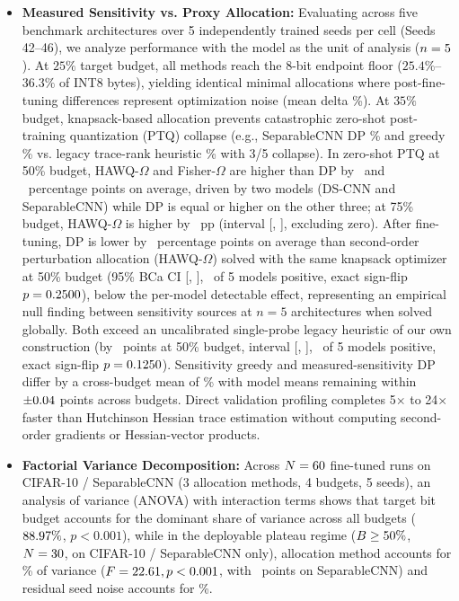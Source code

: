\documentclass{ieeeaccess}
\begin{document}
\begin{itemize}
    \item \textbf{Measured Sensitivity vs. Proxy Allocation:} Evaluating across five benchmark architectures over 5 independently trained seeds per cell (Seeds 42--46), we analyze performance with the model as the unit of analysis ($n = 5$). At $25\%$ target budget, all methods reach the 8-bit endpoint floor ($25.4\%$--$36.3\%$ of INT8 bytes), yielding identical minimal allocations where post-fine-tuning differences represent optimization noise (mean delta \MacroStoryDPHAWQTwentyFive\%). At $35\%$ budget, knapsack-based allocation prevents catastrophic zero-shot post-training quantization (PTQ) collapse (e.g., SeparableCNN DP \MacroSepCNNDPThirtyFivePTQ\% and greedy \MacroSepCNNGreedyThirtyFivePTQ\% vs. legacy trace-rank heuristic \MacroSepCNNHAWQThirtyFivePTQ\% with 3/5 collapse). In zero-shot PTQ at 50\% budget, HAWQ-$\Omega$ and Fisher-$\Omega$ are higher than DP by \MacroPTQDPOmegaAbsMeanFifty\ and \MacroPTQDPFisherAbsMeanFifty\ percentage points on average, driven by two models (DS-CNN and SeparableCNN) while DP is equal or higher on the other three; at 75\% budget, HAWQ-$\Omega$ is higher by \MacroPTQDPOmegaAbsMeanSeventyFive\ pp (interval [\MacroPTQDPOmegaCILowSeventyFive, \MacroPTQDPOmegaCIHighSeventyFive], excluding zero). After fine-tuning, DP is lower by \MacroOmegaAbsMeanDelta\ percentage points on average than second-order perturbation allocation (HAWQ-$\Omega$) solved with the same knapsack optimizer at 50\% budget (95\% BCa CI [\MacroOmegaCILow, \MacroOmegaCIHigh], \MacroOmegaWins\ of 5 models positive, exact sign-flip $p = 0.2500$), below the per-model detectable effect, representing an empirical null finding between sensitivity sources at $n = 5$ architectures when solved globally. Both exceed an uncalibrated single-probe legacy heuristic of our own construction (by \MacroLegacyMeanDelta\ points at 50\% budget, interval [\MacroLegacyCILow, \MacroLegacyCIHigh], \MacroLegacyWins\ of 5 models positive, exact sign-flip $p = 0.1250$). Sensitivity greedy and measured-sensitivity DP differ by a cross-budget mean of \MacroDPGreedyDeltaMean\% with model means remaining within $\pm 0.04$ points across budgets. Direct validation profiling completes 5$\times$ to 24$\times$ faster than Hutchinson Hessian trace estimation without computing second-order gradients or Hessian-vector products.
    \item \textbf{Factorial Variance Decomposition:} Across $N = 60$ fine-tuned runs on CIFAR-10 / SeparableCNN (3 allocation methods, 4 budgets, 5 seeds), an analysis of variance (ANOVA) with interaction terms shows that target bit budget accounts for the dominant share of variance across all budgets ($88.97\%$, $p < 0.001$), while in the deployable plateau regime ($B \ge 50\%$, $N = 30$, on CIFAR-10 / SeparableCNN only), allocation method accounts for \MacroVarPlateauMethodPct\% of variance ($F = 22.61, p < 0.001$, with \MacroMethodPlateauSepEffect\ points on SeparableCNN) and residual seed noise accounts for \MacroVarPlateauResidualPct\%.

\end{itemize}
\end{document}
